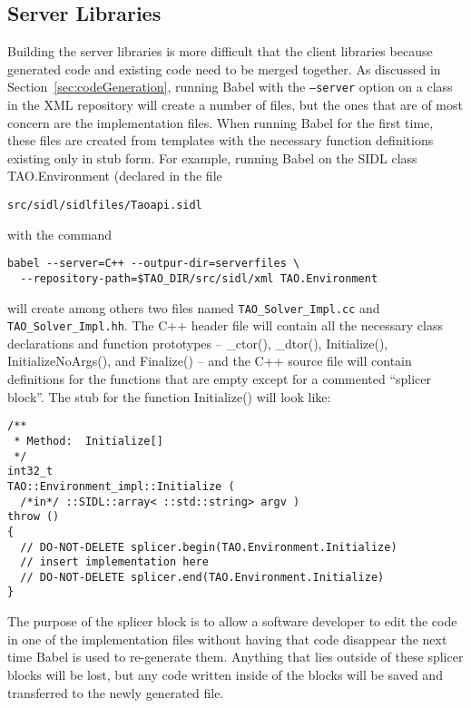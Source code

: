 \documentclass[doublespacing,12pt]{article}
\begin{document}
\subsection{Server Libraries}\label{sec:serverlibs}
Building the server libraries is more difficult that the client libraries 
because generated code and existing code need to be merged together. 
As discussed in Section~\ref{sec:codeGeneration}, running Babel with the 
\texttt{--server} option on a class in the XML repository will create 
a number of files, but the ones that are of most concern are the implementation
files.  When running Babel for the first time, these files are
created from templates with the necessary function definitions existing only 
in stub form.  For example, running Babel on the SIDL class 
\textsf{TAO.En\-vi\-ron\-ment}
(declared in the file 
\begin{verbatim}
src/sidl/sidlfiles/Taoapi.sidl
\end{verbatim}
with the command
\begin{verbatim}
babel --server=C++ --outpur-dir=serverfiles \
  --repository-path=$TAO_DIR/src/sidl/xml TAO.Environment
\end{verbatim} %
will create among others two files named \texttt{TAO\_Solver\_Impl.cc}
and \texttt{TAO\_Solver\_Impl.hh}.  The C++ header file will contain all the
necessary class declarations and function prototypes --
\textsf{\_ctor()},
\textsf{\_dtor()}, \textsf{Initialize()}, \textsf{InitializeNoArgs()},
and 
\textsf{Finalize()} -- and the C++ source file
will contain definitions for the functions that are empty except for a 
commented ``splicer block''.  The stub for the function 
\textsf{Initialize()} will look like:

\small
\begin{verbatim}
/**
 * Method:  Initialize[]
 */
int32_t
TAO::Environment_impl::Initialize (
  /*in*/ ::SIDL::array< ::std::string> argv ) 
throw () 
{
  // DO-NOT-DELETE splicer.begin(TAO.Environment.Initialize)
  // insert implementation here
  // DO-NOT-DELETE splicer.end(TAO.Environment.Initialize)
}
\end{verbatim}
\normalsize

The purpose of the splicer block is to allow a software developer to edit 
the code in one of the implementation files without having that code disappear the next
time Babel is used to re-generate them.  Anything that lies outside of these
splicer blocks will be lost, but any code written inside of the blocks will be
saved and transferred to the newly generated file.
\end{document}
